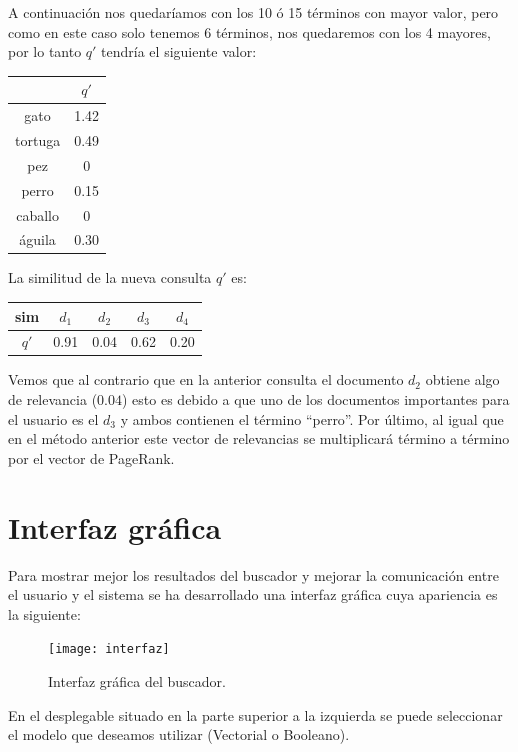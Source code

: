 \documentclass[size=a4, parskip=half, titlepage=false, toc=flat, toc=bib, 12pt, twoside]{scrartcl}
\theoremstyle{theorem-style}
\theoremstyle{definition-style}
\theoremstyle{remark-style}
\theoremstyle{example-style}
\theoremstyle{definition-style}
\theoremstyle{remark-style}
\begin{document}
A continuación nos quedaríamos con los 10 ó 15 términos con mayor valor, pero como en este caso solo tenemos 6 términos, nos quedaremos con los 4 mayores, por lo tanto $q'$ tendría el siguiente valor:
\begin{table}[H]
\centering
\begin{tabular}{|c|c|}
\hline
        & $q'$  \\ \hline
gato    & 1.42 \\ \hline
tortuga & 0.49 \\ \hline
pez     & 0    \\ \hline
perro   & 0.15 \\ \hline
caballo & 0    \\ \hline
águila  & 0.30 \\ \hline
\end{tabular}
\end{table}
La similitud de la nueva consulta $q'$ es:
\begin{table}[H]
\centering
\begin{tabular}{|c|c|c|c|c|}
\hline
sim  & $d_1$ & $d_2$ & $d_3$ & $d_4$ \\ \hline
$q'$ & 0.91  & 0.04  & 0.62  & 0.20  \\ \hline
\end{tabular}
\end{table}
Vemos que al contrario que en la anterior consulta el documento $d_2$ obtiene algo de relevancia ($0.04$) esto es debido a que uno de los documentos importantes para el usuario es el $d_3$ y ambos contienen el término ``perro''.
Por último, al igual que en el método anterior este vector de relevancias se multiplicará término a término por el vector de PageRank.

\newpage

\section{Interfaz gráfica}
Para mostrar mejor los resultados del buscador y mejorar la comunicación entre el usuario y el sistema se ha desarrollado una interfaz gráfica cuya apariencia es la siguiente:

\begin{figure}[H]
\centering
\texttt{[image: interfaz]}
\caption{Interfaz gráfica del buscador.}
\end{figure}

En el desplegable situado en la parte superior a la izquierda se puede seleccionar el modelo que deseamos utilizar (Vectorial o Booleano).
\end{document}
